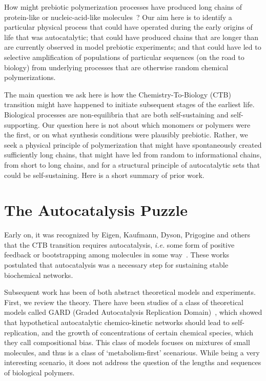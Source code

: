\documentclass[journal=jacsat,manuscript=article,layout=twocolumn]{achemso}
\begin{document}
 How might prebiotic polymerization processes have produced long chains of protein-like or 
 nucleic-acid-like molecules~\cite{Joyce1987,Abel2005}?  Our aim here is to identify a particular 
physical process that could have operated during the early origins of life that was 
autocatalytic; that could have produced chains that are longer than are currently observed in 
model 
prebiotic experiments; and that could have led to selective amplification of populations of 
particular sequences (on the road to biology) from underlying processes that are otherwise random 
chemical polymerizations.  
 
 The main question we ask here is how the Chemistry-To-Biology (CTB) transition might have happened 
to initiate subsequent stages of the earliest life.  Biological processes are non-equilibria that 
are both self-sustaining and self-supporting.  Our question here is not about which monomers or 
polymers were the first, or on what synthesis conditions were plausibly prebiotic.  Rather, we seek 
a physical principle of polymerization that might have spontaneously created sufficiently long 
chains, that might have led from random to informational chains, from short to long chains, and for 
a structural principle of autocatalytic sets that could be 
self-sustaining.  Here is a short summary of prior work.
 
 \section{The Autocatalysis Puzzle}
 
 Early on, it was recognized by Eigen, Kaufmann, Dyson, Prigogine and others that the CTB 
transition requires autocatalysis, \emph{i.e.} some form of positive feedback or bootstrapping 
among molecules in some way~\cite{Eigen1977,Eigen1978,Dyson1985,Prigogine1989,Kauffman1986}.  These 
works postulated that autocatalysis was a necessary step for sustaining stable biochemical 
networks.  
 
 Subsequent work has been of both abstract theoretical models and experiments.  First, we review 
the theory.  There have been studies of a class of theoretical models called GARD (Graded 
Autocatalysis Replication Domain)~\cite{segre1998graded,Segre2000,Markovitch2012}, which showed 
that hypothetical autocatalytic chemico-kinetic networks should lead to self-replication, and the 
growth of concentrations of certain chemical species, which they call compositional bias.  This 
class of models focuses on mixtures of small molecules, and thus is a class of `metabolism-first' 
scenarious. While being a very interesting scenario, it does not address the question of the 
lengths and sequences of biological polymers.
\end{document}
